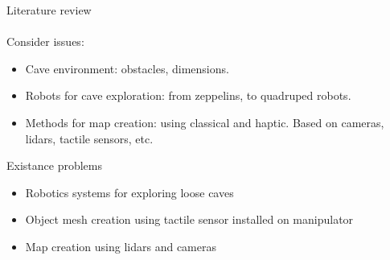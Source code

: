 \documentclass[aspectratio=169,xcolor=table]{beamer}
\begin{document}



\begin{frame}[t]{Literature review}
    \framesubtitle{}
    \vspace{-0.3cm}
    \large
    Consider issues:
    \vspace{-0.1cm}
    \begin{itemize}
        \item Cave environment: obstacles, dimensions.
        \item Robots for cave exploration: from zeppelins, to quadruped robots.
        \item Methods for map creation: using classical and haptic. Based on cameras, lidars, tactile sensors, etc.
    \end{itemize}
    \vspace{-0.2cm}

    \begin{block}{Existance problems}
        \begin{itemize}
            \item Robotics systems for exploring loose caves
            \item Object mesh creation using tactile sensor installed on manipulator
            \item Map creation using lidars and cameras
        \end{itemize}
    \end{block}
    \vspace{-0.2cm}

\end{frame}
\end{document}
